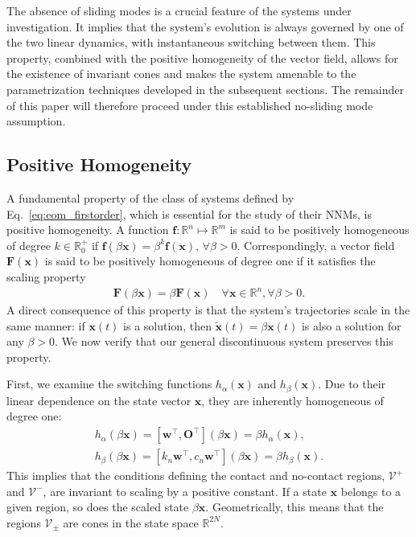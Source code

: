 \documentclass[a4paper,9pt,parskip=half,english]{article}
\theoremstyle{plain}
\theoremstyle{definition}
\newcommand{\T}{^{\!\top}} %
\newcommand{\mR}{\mathbb{R}}
\newcommand{\vf}{\mathbf f}
\newcommand{\vw}{\mathbf w}
\newcommand{\vx}{\mathbf x}
\newcommand{\vF}{\mathbf F}
\newcommand{\vO}{\mathbf O}
\newcommand{\cVplus}{\mathcal{V}^+}
\newcommand{\cVminus}{\mathcal{V}^-}
\begin{document}
The absence of sliding modes is a crucial feature of the systems under investigation. It implies that the system's evolution is always governed by one of the two linear dynamics, with instantaneous switching between them. This property, combined with the positive homogeneity of the vector field, allows for the existence of invariant cones and makes the system amenable to the parametrization techniques developed in the subsequent sections. The remainder of this paper will therefore proceed under this established no-sliding mode assumption.
\subsection{Positive Homogeneity}
A fundamental property of the class of systems defined by Eq.~\eqref{eq:eom_firstorder}, which is essential for the study of their NNMs, is positive homogeneity.
A function $\vf: \mR^n \mapsto \mR^m $ is said to be positively homogeneous of degree $k \in \mR_0^+$ if $\vf(\beta \vx) = \beta^k \vf(\vx), \, \forall \beta > 0$. Correspondingly, a vector field $\vF(\vx)$ is said to be positively homogeneous of degree one if it satisfies the scaling property
\begin{align}\label{eq:homogeneity_def}
	\vF(\beta \vx) = \beta \vF(\vx) \quad \forall \vx \in \mR^n, \forall \beta > 0.
\end{align}
A direct consequence of this property is that the system's trajectories scale in the same manner: if $\vx(t)$ is a solution, then $\tilde{\vx}(t) = \beta \vx(t)$ is also a solution for any $\beta > 0$. We now verify that our general discontinuous system preserves this property.

First, we examine the switching functions $h_{\alpha}(\vx)$ and $h_{\beta}(\vx)$. Due to their linear dependence on the state vector $\vx$, they are inherently homogeneous of degree one:
\begin{align}
	h_{\alpha}(\beta \vx) = [ \vw\T, \vO\T](\beta \vx) = \beta h_{\alpha}(\vx), \\
	h_{\beta}(\beta \vx) = [ k_n\vw\T, c_n\vw\T](\beta \vx) = \beta h_{\beta}(\vx).
\end{align}
This implies that the conditions defining the contact and no-contact regions, $\cVplus$ and $\cVminus$, are invariant to scaling by a positive constant. If a state $\vx$ belongs to a given region, so does the scaled state $\beta \vx$. Geometrically, this means that the regions $\mathcal{V}_{\pm}$ are cones in the state space $\mR^{2N}$.
\end{document}
